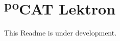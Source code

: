 \chapter{\textsuperscript{po}CAT Lektron }
\hypertarget{index}{}\label{index}
\label{index_md__2c_2_users_2otuam_2_desktop_2_nanosat_2pocat-lektron-sw_2_r_e_a_d_m_e}%
%


This Readme is under development. 